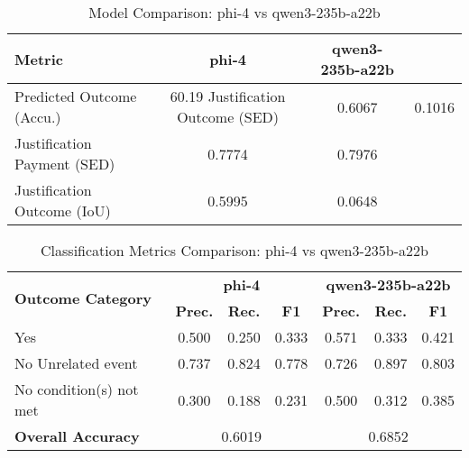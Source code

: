 

\begin{table}[H]
\centering
\caption{Model Comparison: phi-4 vs qwen3-235b-a22b}
\label{tab:model_comparison}
\begin{tabular}{@{}lcc@{}}
\toprule
\textbf{Metric} & \textbf{phi-4} & \textbf{qwen3-235b-a22b} \\
\midrule
Predicted Outcome (Accu.) & 60.19%
Justification Outcome (SED) & 0.6067 & 0.1016 \\
Justification Payment (SED) & 0.7774 & 0.7976 \\
Justification Outcome (IoU) & 0.5995 & 0.0648 \\
\bottomrule
\end{tabular}
\end{table}

\begin{table}[H]
\centering
\caption{Classification Metrics Comparison: phi-4 vs qwen3-235b-a22b}
\label{tab:classification_comparison}
\begin{tabular}{lcccccc}
\toprule
\multirow{2}{*}{\textbf{Outcome Category}} & \multicolumn{3}{c}{\textbf{phi-4}} & \multicolumn{3}{c}{\textbf{qwen3-235b-a22b}} \\
\cmidrule(lr){2-4} \cmidrule(lr){5-7}
 & \textbf{Prec.} & \textbf{Rec.} & \textbf{F1} & \textbf{Prec.} & \textbf{Rec.} & \textbf{F1} \\
\midrule
Yes & 0.500 & 0.250 & 0.333 & 0.571 & 0.333 & 0.421 \\
No \- Unrelated event & 0.737 & 0.824 & 0.778 & 0.726 & 0.897 & 0.803 \\
No \- condition(s) not met & 0.300 & 0.188 & 0.231 & 0.500 & 0.312 & 0.385 \\
\midrule
\textbf{Overall Accuracy} & \multicolumn{3}{c}{0.6019} & \multicolumn{3}{c}{0.6852} \\
\bottomrule
\end{tabular}
\end{table}

